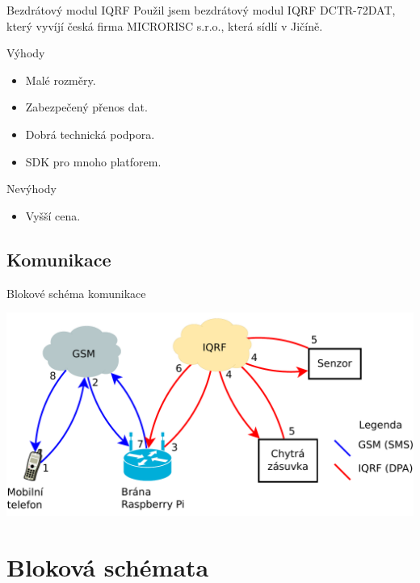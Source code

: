 \documentclass[11pt]{beamer}
\begin{document}
\begin{frame}{Bezdrátový modul IQRF}
  Použil jsem bezdrátový modul IQRF DCTR-72DAT, který vyvíjí česká firma MICRORISC s.r.o., která sídlí v Jičíně.
  \begin{exampleblock}{Výhody}
    \begin{itemize}
      \item Malé rozměry.
      \item Zabezpečený přenos dat.
      \item Dobrá technická podpora.
      \item SDK pro mnoho platforem.
    \end{itemize}
  \end{exampleblock}
  \begin{alertblock}{Nevýhody}
    \begin{itemize}
      \item Vyšší cena.
    \end{itemize}
  \end{alertblock}
\end{frame}

\subsection{Komunikace}

\begin{frame}{Blokové schéma komunikace}
  \begin{center}
    \includegraphics[width = \textwidth]{../img/blokove-schema/komunikace.pdf}
  \end{center}
\end{frame}

\section{Bloková schémata}
\end{document}
